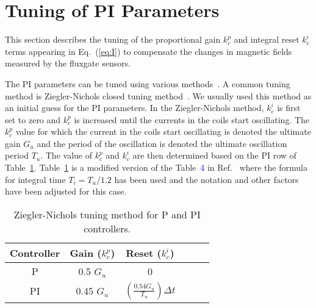 \section{Tuning of PI Parameters}\label{sec:tune}
This section describes the tuning of the proportional gain $k_c^p$ and integral reset $k_c^i$ terms appearing in Eq.~(\ref{eq:I}) to compensate the changes in magnetic fields measured by the fluxgate sensors.

The PI parameters can be tuned using various methods~\cite{tuning}. A common tuning method is Ziegler-Nichols closed tuning method~\cite{tuning_ZN}. We usually used this method as an initial guess for the PI parameters. In the Ziegler-Nichols method, $k_c^i$ is first set to zero and $k_c^p$ is increased until the currents in the coils start oscillating. The $k_c^p$ value for which the current in the coils start oscillating is denoted the ultimate gain $G_{u}$ and the period of the oscillation is denoted the ultimate oscillation period $T_u$. The value of $k_c^p$ and $k_c^i$ are then determined based on the PI row of Table~\ref{table:tuning}. Table~\ref{table:tuning} is a modified version of the Table~\textcolor{blue}{4} in Ref.~\cite{tuning_formula} where the formula for integral time $T_i=T_u/1.2$ has been used and the notation and other factors have been adjusted for this case.


\begin{table} [htb!]
    \centering
    \begin{tabular} { |c|c|c|c|c|c|} 
        \hline
        Controller & Gain ($k_c^p$) & Reset ($k_c^i$)\\
        \hline\hline
         P & 0.5 $G_u$ & 0 \\ 
        \hline
         PI & 0.45 $G_u$ & $\left(\frac{\text{0.54} G_u}{T_u}\right)\Delta t$ \\ 
        \hline
    \end{tabular}
    \caption{Ziegler-Nichols tuning method for P and PI controllers.}\label{table:tuning}
\end{table}

